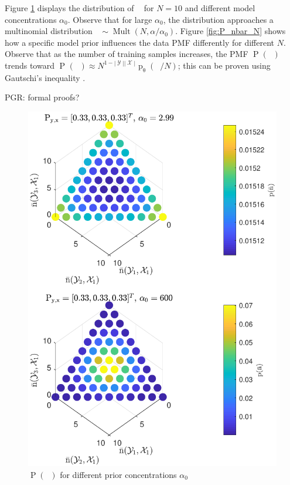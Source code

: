 \documentclass[12pt]{report}
\DeclareMathOperator{\nbarrm}{\bar{\mathrm{n}}}
\DeclareMathOperator{\Prm}{\mathrm{P}}
\DeclareMathOperator{\prm}{\mathrm{p}}
\DeclareMathOperator{\Xcal}{\mathcal{X}}
\DeclareMathOperator{\Ycal}{\mathcal{Y}}
\DeclareMathOperator{\Mult}{\mathrm{Mult}}
\begin{document}
Figure \ref{fig:P_nbar_a0} displays the distribution of $\nbarrm$ for $N=10$ and different model concentrations $\alpha_0$. Observe that for large $\alpha_0$, the distribution approaches a multinomial distribution $\nbarrm \sim \Mult(N,\alpha/\alpha_0)$. Figure \ref{fig:P_nbar_N} shows how a specific model prior influences the data PMF differently for different $N$. Observe that as the number of training samples increases, the PMF $\Prm(\nbarrm)$ trends toward $\Prm_{\nbarrm}(\nbarrm) \approx N^{1-|\Ycal||\Xcal|}\prm_{\uptheta}(\nbarrm/N)$; this can be proven using Gautschi's inequality \cite{wendel}.

PGR: formal proofs?

\begin{figure}
\centering
\includegraphics[width=0.8\linewidth]{P_nbar_a0.pdf}
\caption{$\Prm(\nbarrm)$ for different prior concentrations $\alpha_0$}
\label{fig:P_nbar_a0}
\end{figure}
\end{document}
